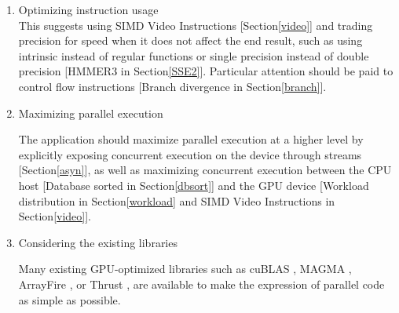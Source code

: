 \begin{enumerate}
 \item Optimizing instruction usage\\
 This suggests using SIMD Video Instructions [Section\ref{video}] and trading precision for speed when it does not affect the end result, such as using intrinsic instead of regular functions or single precision instead of double precision [HMMER3 in Section\ref{SSE2}]. Particular attention should be paid to control flow instructions [Branch divergence in Section\ref{branch}].
 
 \item Maximizing parallel execution
 
 The application should maximize parallel execution at a higher level by explicitly exposing concurrent execution on the device through streams [Section\ref{asyn}], as well as maximizing concurrent execution between the CPU host  [Database sorted in Section\ref{dbsort}] and the GPU device [Workload distribution in Section\ref{workload} and SIMD Video Instructions in Section\ref{video}].
 
 \item Considering the existing libraries
 
 Many existing GPU-optimized libraries \citep{CUDAlibs} such as cuBLAS \citep{cuBLAS}, MAGMA \citep{MAGMA}, ArrayFire \citep{ArrayFire}, or Thrust \citep{thrust}, are available to make the expression of parallel code as simple as possible.
 
\end{enumerate}


